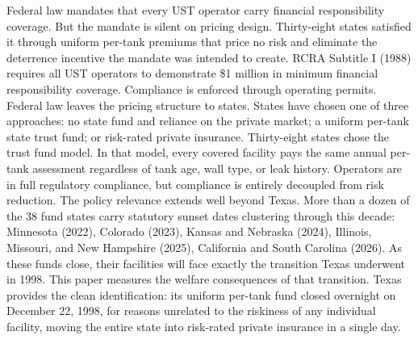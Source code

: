 \documentclass[
  12pt,
]{article}
\begin{document}
Federal law mandates that every UST operator carry financial
responsibility coverage. But the mandate is silent on pricing design.
Thirty-eight states satisfied it through uniform per-tank premiums that
price no risk and eliminate the deterrence incentive the mandate was
intended to create. RCRA Subtitle I (1988) requires all UST operators to
demonstrate \$1 million in minimum financial responsibility coverage.
Compliance is enforced through operating permits. Federal law leaves the
pricing structure to states. States have chosen one of three approaches:
no state fund and reliance on the private market; a uniform per-tank
state trust fund; or risk-rated private insurance. Thirty-eight states
chose the trust fund model. In that model, every covered facility pays
the same annual per-tank assessment regardless of tank age, wall type,
or leak history. Operators are in full regulatory compliance, but
compliance is entirely decoupled from risk reduction. The policy
relevance extends well beyond Texas. More than a dozen of the 38 fund
states carry statutory sunset dates clustering through this decade:
Minnesota (2022), Colorado (2023), Kansas and Nebraska (2024), Illinois,
Missouri, and New Hampshire (2025), California and South Carolina
(2026). As these funds close, their facilities will face exactly the
transition Texas underwent in 1998. This paper measures the welfare
consequences of that transition. Texas provides the clean
identification: its uniform per-tank fund closed overnight on December
22, 1998, for reasons unrelated to the riskiness of any individual
facility, moving the entire state into risk-rated private insurance in a
single day.
\end{document}
